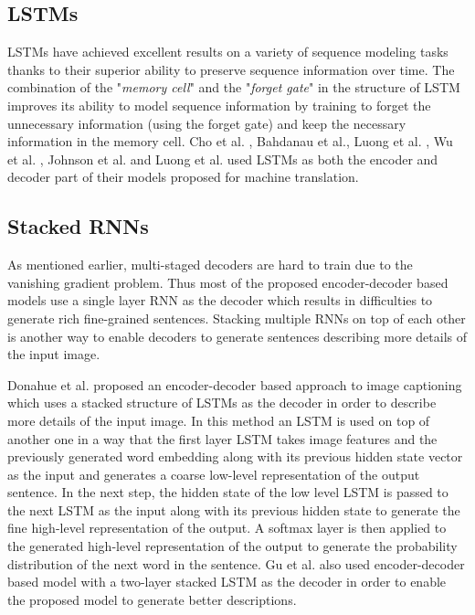 \documentclass[preprint, 12pt]{elsarticle}
\begin{document}
		\subsection{LSTMs}
		LSTMs have achieved excellent results on a variety of sequence modeling tasks thanks to their superior ability to preserve sequence information over time. The combination of the "\textit{memory cell}" and the "\textit{forget gate}" in the structure of LSTM improves its ability to model sequence information by training to forget the unnecessary information (using the forget gate) and keep the necessary information in the memory cell. Cho et al. \cite{cho2014learning}, Bahdanau et al.\cite{bahdanau2014neural}, Luong et al. \cite{luong2015effective}, Wu et al. \cite{wu2016google}, Johnson et al. \cite{johnson2017google} and Luong et al. \cite{luong2014addressing} used LSTMs as both the encoder and decoder part of their models proposed for machine translation.
		\subsection{Stacked RNNs}
		As mentioned earlier, multi-staged decoders are hard to train due to the vanishing gradient problem. Thus most of the proposed encoder-decoder based models use a single layer RNN as the decoder which results in difficulties to generate rich fine-grained sentences. Stacking multiple RNNs on top of each other is another way to enable decoders to generate sentences describing more details of the input image.
		
		Donahue et al. \cite{donahue2015long} proposed an encoder-decoder based approach to image captioning which uses a stacked structure of LSTMs as the decoder in order to describe more details of the input image. In this method an LSTM is used on top of another one in a way that the first layer LSTM takes image features and the previously generated word embedding along with its previous hidden state vector as the input and generates a coarse low-level representation of the output sentence. In the next step, the hidden state of the low level LSTM is passed to the next LSTM as the input along with its previous hidden state to generate the fine high-level representation of the output. A softmax layer is then applied to the generated high-level representation of the output to generate the probability distribution of the next word in the sentence. Gu et al. \cite{gu2018stack} also used encoder-decoder based model with a two-layer stacked LSTM as the decoder in order to enable the proposed model to generate better descriptions.
		
\end{document}
